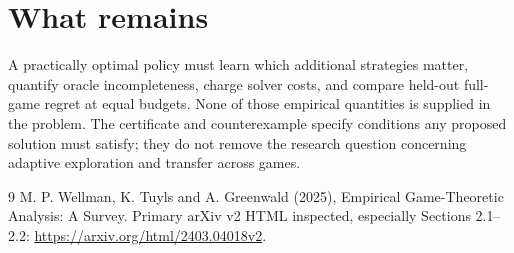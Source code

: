 \documentclass[11pt]{article}
\begin{document}
\section*{What remains}
A practically optimal policy must learn which additional strategies matter, quantify oracle incompleteness, charge solver costs, and compare held-out full-game regret at equal budgets. None of those empirical quantities is supplied in the problem. The certificate and counterexample specify conditions any proposed solution must satisfy; they do not remove the research question concerning adaptive exploration and transfer across games.
\begin{thebibliography}{9}
 M. P. Wellman, K. Tuyls and A. Greenwald (2025), Empirical Game-Theoretic Analysis: A Survey. Primary arXiv v2 HTML inspected, especially Sections 2.1--2.2:
\url{https://arxiv.org/html/2403.04018v2}.
\end{thebibliography}
\end{document}
